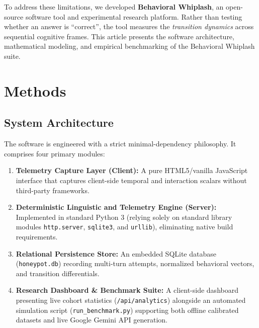 \documentclass[10pt,a4paper]{article}
\begin{document}
To address these limitations, we developed \textbf{Behavioral Whiplash}, an open-source software tool and experimental research platform. Rather than testing whether an answer is ``correct'', the tool measures the \textit{transition dynamics} across sequential cognitive frames. This article presents the software architecture, mathematical modeling, and empirical benchmarking of the Behavioral Whiplash suite.

\section*{Methods}

\subsection*{System Architecture}
The software is engineered with a strict minimal-dependency philosophy. It comprises four primary modules:
\begin{enumerate}
    \item \textbf{Telemetry Capture Layer (Client):} A pure HTML5/vanilla JavaScript interface that captures client-side temporal and interaction scalars without third-party frameworks.
    \item \textbf{Deterministic Linguistic and Telemetry Engine (Server):} Implemented in standard Python 3 (relying solely on standard library modules \texttt{http.server}, \texttt{sqlite3}, and \texttt{urllib}), eliminating native build requirements.
    \item \textbf{Relational Persistence Store:} An embedded SQLite database (\texttt{honeypot.db}) recording multi-turn attempts, normalized behavioral vectors, and transition differentials.
    \item \textbf{Research Dashboard \& Benchmark Suite:} A client-side dashboard presenting live cohort statistics (\texttt{/api/analytics}) alongside an automated simulation script (\texttt{run\_benchmark.py}) supporting both offline calibrated datasets and live Google Gemini API generation.
\end{enumerate}
\end{document}
